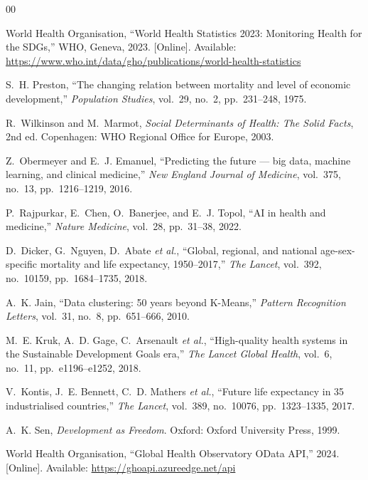 \documentclass[conference]{IEEEtran}
\begin{document}
\begin{thebibliography}{00}

World Health Organisation, ``World Health Statistics 2023: Monitoring Health for
the SDGs,'' WHO, Geneva, 2023. [Online]. Available:
\url{https://www.who.int/data/gho/publications/world-health-statistics}

S.~H. Preston, ``The changing relation between mortality and level of economic
development,'' \emph{Population Studies}, vol.~29, no.~2, pp.~231--248, 1975.

R.~Wilkinson and M.~Marmot, \emph{Social Determinants of Health: The Solid
Facts}, 2nd ed. Copenhagen: WHO Regional Office for Europe, 2003.

Z.~Obermeyer and E.~J. Emanuel, ``Predicting the future — big data, machine
learning, and clinical medicine,'' \emph{New England Journal of Medicine},
vol.~375, no.~13, pp.~1216--1219, 2016.

P.~Rajpurkar, E.~Chen, O.~Banerjee, and E.~J. Topol, ``AI in health and
medicine,'' \emph{Nature Medicine}, vol.~28, pp.~31--38, 2022.

D.~Dicker, G.~Nguyen, D.~Abate \emph{et al.}, ``Global, regional, and national
age-sex-specific mortality and life expectancy, 1950--2017,'' \emph{The Lancet},
vol.~392, no.~10159, pp.~1684--1735, 2018.

A.~K. Jain, ``Data clustering: 50 years beyond K-Means,''
\emph{Pattern Recognition Letters}, vol.~31, no.~8, pp.~651--666, 2010.

M.~E. Kruk, A.~D. Gage, C.~Arsenault \emph{et al.}, ``High-quality health
systems in the Sustainable Development Goals era,'' \emph{The Lancet Global
Health}, vol.~6, no.~11, pp.~e1196--e1252, 2018.

V.~Kontis, J.~E. Bennett, C.~D. Mathers \emph{et al.}, ``Future life
expectancy in 35 industrialised countries,'' \emph{The Lancet}, vol.~389,
no.~10076, pp.~1323--1335, 2017.

A.~K. Sen, \emph{Development as Freedom}. Oxford: Oxford University Press,
1999.

World Health Organisation, ``Global Health Observatory OData API,'' 2024.
[Online]. Available: \url{https://ghoapi.azureedge.net/api}


\end{thebibliography}
\end{document}
